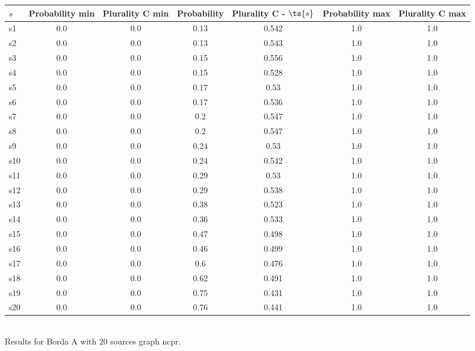 \documentclass{article}
\begin{document}
\noindent\begin{tabular}{|l|c|c|c|c|c|c|}
\hline
$s$& Probability min & Plurality C min & Probability & Plurality C - $\ts{s}$ & Probability max & Plurality C max\\
\hline
s1 &0.0 & 0.0 & 0.13 & 0.542 & 1.0 & 1.0\\
\hline
s2 &0.0 & 0.0 & 0.13 & 0.543 & 1.0 & 1.0\\
\hline
s3 &0.0 & 0.0 & 0.15 & 0.556 & 1.0 & 1.0\\
\hline
s4 &0.0 & 0.0 & 0.15 & 0.528 & 1.0 & 1.0\\
\hline
s5 &0.0 & 0.0 & 0.17 & 0.53 & 1.0 & 1.0\\
\hline
s6 &0.0 & 0.0 & 0.17 & 0.536 & 1.0 & 1.0\\
\hline
s7 &0.0 & 0.0 & 0.2 & 0.547 & 1.0 & 1.0\\
\hline
s8 &0.0 & 0.0 & 0.2 & 0.547 & 1.0 & 1.0\\
\hline
s9 &0.0 & 0.0 & 0.24 & 0.53 & 1.0 & 1.0\\
\hline
s10 &0.0 & 0.0 & 0.24 & 0.542 & 1.0 & 1.0\\
\hline
s11 &0.0 & 0.0 & 0.29 & 0.53 & 1.0 & 1.0\\
\hline
s12 &0.0 & 0.0 & 0.29 & 0.538 & 1.0 & 1.0\\
\hline
s13 &0.0 & 0.0 & 0.38 & 0.523 & 1.0 & 1.0\\
\hline
s14 &0.0 & 0.0 & 0.36 & 0.533 & 1.0 & 1.0\\
\hline
s15 &0.0 & 0.0 & 0.47 & 0.498 & 1.0 & 1.0\\
\hline
s16 &0.0 & 0.0 & 0.46 & 0.499 & 1.0 & 1.0\\
\hline
s17 &0.0 & 0.0 & 0.6 & 0.476 & 1.0 & 1.0\\
\hline
s18 &0.0 & 0.0 & 0.62 & 0.491 & 1.0 & 1.0\\
\hline
s19 &0.0 & 0.0 & 0.75 & 0.431 & 1.0 & 1.0\\
\hline
s20 &0.0 & 0.0 & 0.76 & 0.441 & 1.0 & 1.0\\
\hline
\end{tabular}\\

\noindent Results for Borda A with 20 sources graph ncpr.
\end{document}
